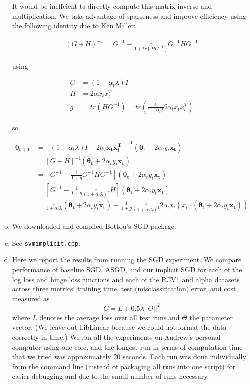 \documentclass{article}
\renewcommand{\vec}[1]{\boldsymbol{#1}}
\begin{document}
\begin{enumerate}[(a)]
It would be ineffcient to directly compute this matrix inverse and multiplication.  We take advantage of sparseness and improve efficiency using the following identity due to Ken Miller:

\begin{align*}
(G + H)^{-1} = G^{-1} - \frac{1}{1 + tr(HG^{-1})}G^{-1}HG^{-1}
\end{align*}

using

\begin{align*}
G &= (1 + \alpha_t \lambda)I \\
H &= 2 \alpha x_t x_t^T \\
g &= tr(HG^{-1}) = tr \left( \frac{1}{1 + \alpha_t \lambda} 2 \alpha_t x_t x_t^T \right)
\end{align*}

so 

\begin{align*}
\vec{\theta_{t+1}} &= \left[(1+\alpha_t\lambda)I + 2\alpha_t\vec{x_t}\vec{x_t^T}\right]^{-1}\left(\vec{\theta_t} + 2\alpha_t y_t \vec{x_t}\right) \\
&= \left[G + H\right]^{-1}\left(\vec{\theta_t} + 2\alpha_t y_t \vec{x_t}\right) \\
&= \left[ G^{-1} - \frac{1}{1 + g}G^{-1}HG^{-1} \right] \left(\vec{\theta_t} + 2\alpha_t y_t \vec{x_t}\right) \\
&= \left[ G^{-1} - \frac{1}{1 + g}\frac{1}{(1 + \alpha_t \lambda)^2}H \right] \left(\vec{\theta_t} + 2\alpha_t y_t \vec{x_t}\right) \\
&= \frac{1}{1 + \alpha_t \lambda} \left(\vec{\theta_t} + 2\alpha_t y_t \vec{x_t}\right)  - \frac{1}{1 + g}\frac{1}{(1 + \alpha_t \lambda)^2} 2 \alpha_t x_t \left( x_t  \cdot \left(\vec{\theta_t} + 2\alpha_t y_t \vec{x_t}\right) \right)
\end{align*}


\item We downloaded and compiled Bottou's SGD package.
\item See \texttt{svmimplicit.cpp}.
\item Here we report the results from running the SGD experiment. We compare performance of baseline SGD, ASGD, and our implicit SGD for each of the log loss and hinge loss functions and each of the RCV1 and alpha datasets across three metrics: training time, test (misclassification) error, and cost, measured as  $$C = L + 0.5 \lambda ||\Theta||^2$$ where $L$ denotes the average loss over all test runs and $\Theta$ the parameter vector. (We leave out LibLinear because we could not format the data correctly in time.) We ran all the experiments on Andrew's personal computer using one core, and the longest run in terms of computation time that we tried was approximately 20 seconds. Each run was done individually from the command line (instead of packaging all runs into one script) for easier debugging and due to the small number of runs necessary.


\end{enumerate}
\end{document}
